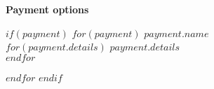 \vspace{1cm}

\Large\textbf{Payment options}\normalsize

$if(payment)$
$for(payment)$
\textbf{$payment.name$} \\
$for(payment.details)$
$payment.details$ \\
$endfor$

$endfor$
$endif$